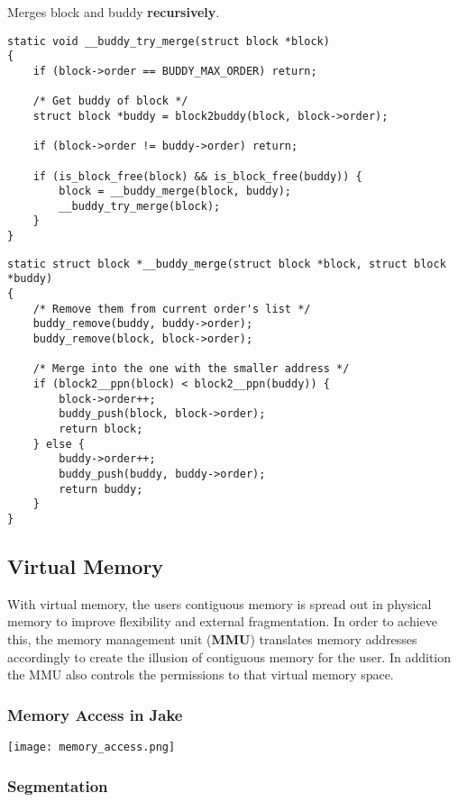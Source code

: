 \newpar{}

Merges block and buddy \textbf{recursively}.
\begin{lstlisting}[style=bright_C++]
static void __buddy_try_merge(struct block *block)
{
    if (block->order == BUDDY_MAX_ORDER) return;

    /* Get buddy of block */
    struct block *buddy = block2buddy(block, block->order);

    if (block->order != buddy->order) return;

    if (is_block_free(block) && is_block_free(buddy)) {
        block = __buddy_merge(block, buddy);
        __buddy_try_merge(block);
    }
}
\end{lstlisting}
\newpar{}
\begin{lstlisting}[style=bright_C++]
static struct block *__buddy_merge(struct block *block, struct block *buddy)
{
    /* Remove them from current order's list */
    buddy_remove(buddy, buddy->order);
    buddy_remove(block, block->order);

    /* Merge into the one with the smaller address */
    if (block2__ppn(block) < block2__ppn(buddy)) {
        block->order++;
        buddy_push(block, block->order);
        return block;
    } else {
        buddy->order++;
        buddy_push(buddy, buddy->order);
        return buddy;
    }
}
\end{lstlisting}

\subsection{Virtual Memory}
With virtual memory, the users contiguous memory is spread out in physical memory to improve flexibility and external fragmentation.
In order to achieve this, the memory management unit (\textbf{MMU}) translates memory addresses accordingly to create the illusion of contiguous memory for the user. In addition the MMU also controls the permissions to that virtual memory space.

\subsubsection{Memory Access in Jake}
\begin{center}
    \texttt{[image: memory\_access.png]}
\end{center}

\subsubsection{Segmentation}

